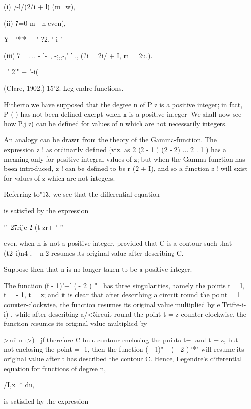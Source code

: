 {(i) /-l/(2/i + l) (m=w),

(ii) 7=0 m - n even),

Y - '*'* + " ?2. ' i '

(iii) 7= . .. - '-~, -;,,-,' ' ., (?i = 2i/ + I, m = 2u.).

\ ' 2'" + "-i(%

(Clare, 1902.) 15'2. Leg endre functions.

Hitherto we have supposed that the degree n of P z is a positive
integer; in fact, P ( ) has not been defined except when n is a
positive integer. We shall now see how P,j z) can be defined for
values of n which are not necessarily integers.

An analogy can be drawn from the theory of the Gamma-function. The
expression z ! as ordinarily defined (viz. as 2 (2 - 1 ) (2 - 2) ... 2
. 1 ) has a meaning only for positive integral values of z; but when
the Gamma-function has been introduced, z ! can be defined to be r (2
+ I), and so a function z ! will exist for values of z which are not
integers.

Referring to"13, we see that the differential equation

is satisfied by the expression

''~27rijc 2-(t-zr+ ' ''

even when n is not a positive integer, provided that C is a contour
such that (t2\ i)n4-i \ -n-2 resumes its original value after
describing C.

Suppose then that n is no longer taken to be a positive integer.

The function (f - 1)"+' ( - 2 )~"~ has three singularities, namely the
points t = l, t = - 1, t = z; and it is clear that after describing a
circuit round the point = 1 counter-clockwise, the function resumes
its original value multiplied by e Trtfre-i-i) . while after
describing a/<5ircuit round the point t = z counter-clockwise, the
function resumes its original value multiplied by

%
%

  >nii-n-:>) \ jf therefore C be a contour enclosing the points t=l
and t = z, but not enclosing the point = -1, then the function ( -
1)"+ ( - 2 )-'*" will resume its original value after t has described
the contour C. Hence, Legendre's differential equation for functions
of degree n,

/I,x' * du,

is satisfied hy the expression

}
